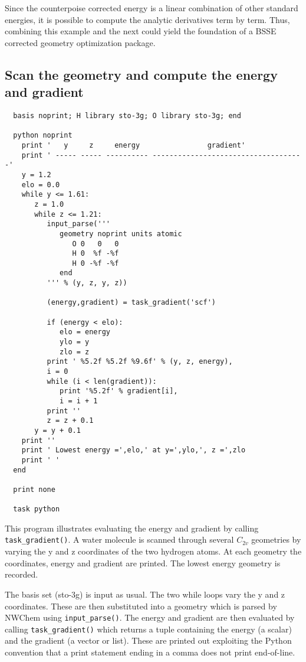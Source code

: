 Since the counterpoise corrected energy is a linear combination of
other standard energies, it is possible to compute the analytic
derivatives term by term.  Thus, combining this example and the next
could yield the foundation of a BSSE corrected geometry optimization
package.

\subsection{Scan the geometry and compute the energy and gradient}

\begin{verbatim}
  basis noprint; H library sto-3g; O library sto-3g; end

  python noprint
    print '   y     z     energy                gradient'
    print ' ----- ----- ---------- ------------------------------------'
    y = 1.2
    elo = 0.0
    while y <= 1.61:
       z = 1.0
       while z <= 1.21:
          input_parse('''
             geometry noprint units atomic
                O 0   0   0
                H 0  %f -%f
                H 0 -%f -%f
             end
          ''' % (y, z, y, z))

          (energy,gradient) = task_gradient('scf')

          if (energy < elo):
             elo = energy
             ylo = y
             zlo = z
          print ' %5.2f %5.2f %9.6f' % (y, z, energy),
          i = 0
          while (i < len(gradient)):
             print '%5.2f' % gradient[i],
             i = i + 1
          print ''
          z = z + 0.1
       y = y + 0.1
    print ''
    print ' Lowest energy =',elo,' at y=',ylo,', z =',zlo
    print ' '
  end

  print none

  task python
\end{verbatim}

This program illustrates evaluating the energy and gradient
by calling \verb+task_gradient()+.  A water molecule is scanned
through several $C_{2v}$ geometries by varying the y and z coordinates
of the two hydrogen atoms.  At each geometry the coordinates, energy 
and gradient are printed.  The lowest energy geometry is recorded.

The basis set (sto-3g) is input as usual.  The two while loops vary
the y and z coordinates.  These are then substituted into a geometry
which is parsed by NWChem using \verb+input_parse()+.  The energy and
gradient are then evaluated by calling \verb+task_gradient()+ which
returns a tuple containing the energy (a scalar) and the gradient (a
vector or list).  These are printed out exploiting the Python
convention that a print statement ending in a comma does not print
end-of-line.

